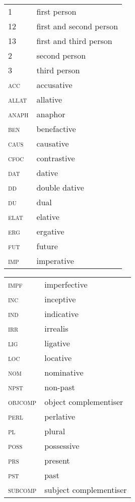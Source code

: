 \documentclass[output=paper]{../langscibook}
\begin{document}
\begin{tabularx}{.45\textwidth}{>{\scshape}lQ}
1 &                  first person\\
12 &                  first and second person\\
13 &                  first and third person\\
2 &                  second person\\
3 &                  third person\\
\textsc{acc}  &  accusative\\
\textsc{allat} &                  allative\\
\textsc{anaph} &                  anaphor\\
\textsc{ben} &                  benefactive\\
\textsc{caus} &        causative\\
\textsc{cfoc} &      contrastive\\
\textsc{dat} &         dative\\
\textsc{dd} &                  double dative\\
\textsc{du} &                  dual\\
\textsc{elat} &                  elative\\
\textsc{erg} &                  ergative\\
\textsc{fut} &                  future\\
\textsc{imp} &                  imperative\\
\end{tabularx}
\begin{tabularx}{.45\textwidth}{>{\scshape}lQ}
\textsc{impf} &                  imperfective\\
\textsc{inc} &                  inceptive\\
\textsc{ind} &                  indicative\\
\textsc{irr} &                  irrealis\\
\textsc{lig} &                  ligative\\
\textsc{loc} &                  locative\\
\textsc{nom} &                  nominative\\
\textsc{npst} &                  non-past\\
\textsc{objcomp} &           object complementiser\\
\textsc{perl} &                  perlative\\
\textsc{pl} &                  plural\\
\textsc{poss} &                  possessive\\
\textsc{prs} &                  present\\
\textsc{pst} &                  past\\
\textsc{subcomp} &         subject complementiser\\ 
\end{tabularx}

\sloppy\printbibliography[heading=subbibliography,notkeyword=this]
\end{document}
